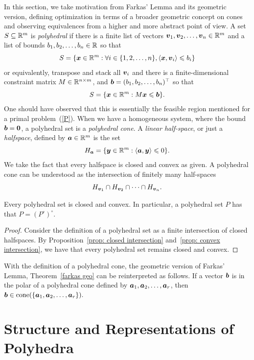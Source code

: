 
In this section, we take motivation from Farkas' Lemma and its geometric version, defining optimization in terms of a broader geometric concept on cones and observing equivalences from a higher and more abstract point of view. A set $S\subseteq\mathbb R^m$ is {\em polyhedral} if there is a finite list of vectors $\boldsymbol v_1, \boldsymbol v_2,\dots, \boldsymbol v_n \in\mathbb R^m$ and a list of bounds $b_1, b_2, \dots, b_n\in\mathbb R$ so that 
\[ S = \{ {\boldsymbol x}\in\mathbb R^m :\forall i\in\{1, 2, \dots, n\}, \left\langle{\boldsymbol x}, {\boldsymbol v}_i\right\rangle\leqslant b_i \} \]
or equivalently, transpose and stack all ${\boldsymbol v}_i$ and there is a finite-dimensional constraint matrix $M\in\mathbb R^{n\times m}$, and ${\boldsymbol b} = (b_1, b_2, \dots, b_n)^\top$ so that 
\[ S = \{ {\boldsymbol x}\in\mathbb R^m : M{\boldsymbol x}\leqslant {\boldsymbol b}\}. \]
One should have observed that this is essentially the feasible region mentioned for a primal problem~(\ref{P}). When we have a homogeneous system, where the bound ${\boldsymbol b} = \boldsymbol0$, a polyhedral set is a {\em polyhedral cone}. A {\em linear half-space}, or just a {\em halfspace}, defined by ${\boldsymbol a}\in\mathbb R^m$ is the set \[ H_{\boldsymbol a} = \{{\boldsymbol y}\in\mathbb R^m: \left\langle{\boldsymbol a}, {\boldsymbol y}\right\rangle \leqslant 0\}. \]
We take the fact that every halfspace is closed and convex as given. A polyhedral cone can be understood as the intersection of finitely many half-spaces 
\[ H_{{\boldsymbol v}_1}\cap H_{{\boldsymbol v}_2}\cap \dots \cap H_{{\boldsymbol v}_n}. \]
 
 \begin{proposition}\label{prop: polyhedrals are closed and convex}
Every polyhedral set is closed and convex. In particular, a polyhedral set $P$ has that $P = (P^\circ)^\circ$.  
\end{proposition}
\begin{proof}
Consider the definition of a polyhedral set as a finite intersection of closed halfspaces. By Proposition~\ref{prop: closed intersection} and~\ref{prop: convex intersection}, we have that every polyhedral set remains closed and convex. 
\end{proof}

\begin{remark}\label{remark: geometric polar farkas}
With the definition of a polyhedral cone, the geometric version of Farkas' Lemma, Theorem~\ref{farkas geo} can be reinterpreted as follows. If a vector ${\boldsymbol b}$ is in the polar of a polyhedral cone defined by ${\boldsymbol a}_1, {\boldsymbol a}_2, \dots, {\boldsymbol a}_r$, then ${\boldsymbol b}\in\operatorname{cone}(\{{\boldsymbol a}_1, {\boldsymbol a}_2, \dots, {\boldsymbol a}_r\}). $
\end{remark}


\section{Structure and Representations of Polyhedra}

